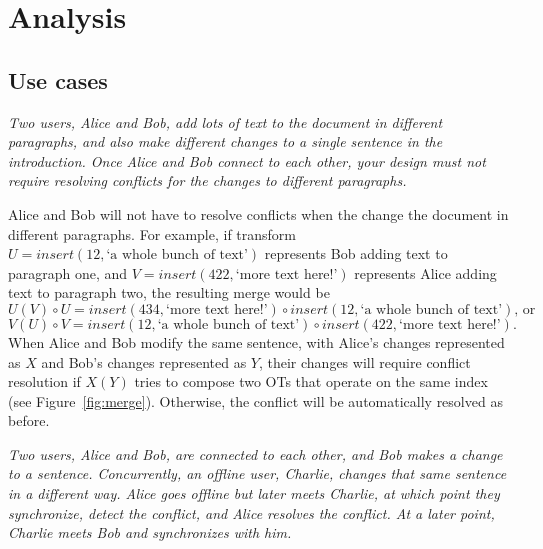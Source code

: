 \documentclass[11pt,titlepage]{article}
\begin{document}
\section{Analysis}

\subsection{Use cases}

\emph{Two users, Alice and Bob, add lots of text to the document in
  different paragraphs, and also make different changes to a single
  sentence in the introduction. Once Alice and Bob connect to each
  other, your design must not require resolving conflicts for the
  changes to different paragraphs.}

\vspace{5mm}

Alice and Bob will not have to resolve conflicts when the change the
document in different paragraphs. For example, if transform $U =
insert(12, \text{`a whole bunch of text'})$ represents Bob adding
text to paragraph one, and $V = insert(422, \text{`more text
  here!'})$ represents Alice adding text to paragraph two, the
resulting merge would be
\begin{equation*}
U(V)\circ U = insert(434, \text{`more text
  here!'})\circ insert(12, \text{`a whole bunch of text'})\text{, or}
\end{equation*}
\begin{equation*}
V(U)\circ V = insert(12, \text{`a whole bunch of text'})\circ
insert(422, \text{`more text here!'}).
\end{equation*}
When Alice and Bob modify
the same sentence, with Alice's changes represented as $X$ and Bob's
changes represented as $Y$, their changes will require conflict
resolution if $X(Y)$ tries to compose two OTs that operate on the same
index (see Figure~\ref{fig:merge}). Otherwise, the conflict will be
automatically resolved as before.

\vspace{5mm}
\noindent
\emph{Two users, Alice and Bob, are connected to each other, and Bob
  makes a change to a sentence. Concurrently, an offline user,
  Charlie, changes that same sentence in a different way. Alice goes
  offline but later meets Charlie, at which point they synchronize,
  detect the conflict, and Alice resolves the conflict. At a later
  point, Charlie meets Bob and synchronizes with him.}

\vspace{5mm}  
\end{document}
